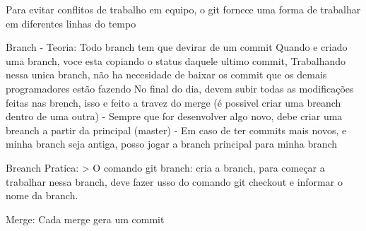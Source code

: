 Para evitar conflitos de trabalho em equipo, o git fornece uma forma de trabalhar em diferentes linhas do tempo

Branch - Teoria: Todo branch tem que devirar de um commit 
Quando e criado uma branch, voce esta copiando o status daquele ultimo commit,
Trabalhando nessa unica branch, não ha necesidade de baixar os commit que os demais programadores estão fazendo
No final do dia, devem subir todas as modificações feitas nas brench, isso e feito a travez do merge
(é possivel criar uma breanch dentro de uma outra)
 - Sempre que for desenvolver algo novo, debe criar uma breanch a partir da principal (master)
 - Em caso de ter commits mais novos, e minha branch seja antiga, posso jogar a branch principal
    para minha branch

Breanch Pratica: 
> O comando git branch: cria a branch, para começar a trabalhar nessa branch, deve fazer usso do comando
git checkout e informar o nome da branch.

Merge: Cada merge gera um commit 

 
